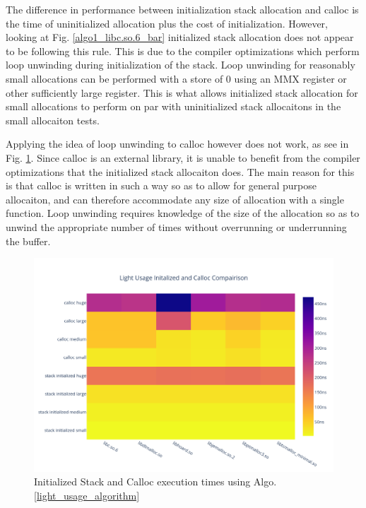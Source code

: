 \documentclass[letterpaper, 10 pt, conference]{ieeeconf}  %
\begin{document}
The difference in performance between initialization stack allocation and calloc is the time of uninitialized allocation plus the cost of initialization.
However, looking at Fig. \ref{algo1_libc.so.6_bar} initialized stack allocation does not appear to be following this rule.
This is due to the compiler optimizations which perform loop unwinding during initialization of the stack.
Loop unwinding for reasonably small allocations can be performed with a store of $0$ using an MMX register or other sufficiently large register.
This is what allows initialized stack allocation for small allocations to perform on par with uninitialized stack allocaitons in the small allocaiton tests.

Applying the idea of loop unwinding to calloc however does not work, as see in Fig. \ref{algo1_init_calloc_hist}.
Since calloc is an external library, it is unable to benefit from the compiler optimizations that the initialized stack allocaiton does.
The main reason for this is that calloc is written in such a way so as to allow for general purpose allocaiton, and can therefore accommodate any size of allocation with a single function.
Loop unwinding requires knowledge of the size of the allocation so as to unwind the appropriate number of times without overrunning or underrunning the buffer. 

\begin{figure}[tbh!]
  \centering
  \includegraphics[width=\columnwidth]{graphs/light_init_calloc_hist.png}
  \caption{ Initialized Stack and Calloc execution times using Algo. \ref{light_usage_algorithm} }
  \label{algo1_init_calloc_hist}
\end{figure} 
\end{document}
